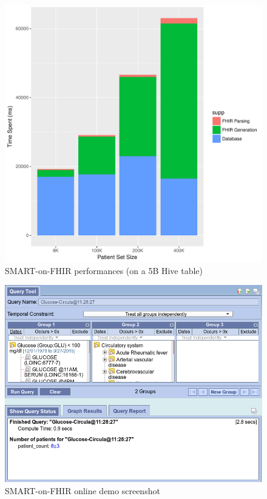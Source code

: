 \documentclass{amia}
\begin{document}
\begin{figure}[h!]
\centering
\includegraphics[scale=.7]{graph1.pdf}
	\caption{SMART-on-FHIR performances (on a 5B Hive table)}
\label{fig2}
\end{figure}
\begin{figure}[h!]
\centering
\includegraphics[scale=.5]{demo.png}
	\caption{SMART-on-FHIR online demo screenshot}
\label{fig3}
\end{figure}
\end{document}
